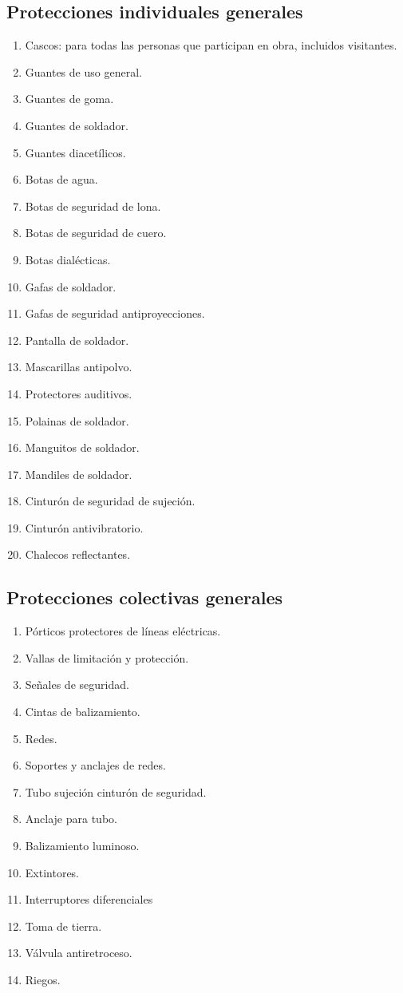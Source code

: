 \subsection{Protecciones individuales generales}
\label{subsec:sys-prlEPI}
\begin{enumerate}
    \item Cascos: para todas las personas que participan en obra, incluidos visitantes.
    \item Guantes de uso general.
    \item Guantes de goma.
    \item Guantes de soldador.
    \item Guantes diacetílicos.
    \item Botas de agua.
    \item Botas de seguridad de lona.
    \item Botas de seguridad de cuero.
    \item Botas dialécticas.
    \item Gafas de soldador.
    \item Gafas de seguridad antiproyecciones.
    \item Pantalla de soldador.
    \item Mascarillas antipolvo.
    \item Protectores auditivos.
    \item Polainas de soldador.
    \item Manguitos de soldador.
    \item Mandiles de soldador.
    \item Cinturón de seguridad de sujeción.
    \item Cinturón antivibratorio.
    \item Chalecos reflectantes.
\end{enumerate}
\subsection{Protecciones colectivas generales}
\label{subsec:sys-prlEPC}

\begin{enumerate}
    \item Pórticos protectores de líneas eléctricas.
    \item Vallas de limitación y protección.
    \item Señales de seguridad.
    \item Cintas de balizamiento.
    \item Redes.
    \item Soportes y anclajes de redes.
    \item Tubo sujeción cinturón de seguridad.
    \item Anclaje para tubo.
    \item Balizamiento luminoso.
    \item Extintores.
    \item Interruptores diferenciales
    \item Toma de tierra.
    \item Válvula antiretroceso.
    \item Riegos.
\end{enumerate}
